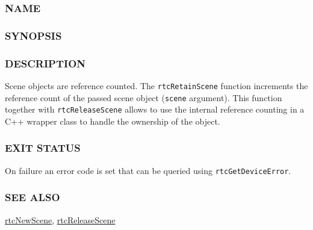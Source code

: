 \subsubsection{NAME}\label{name}

\begin{Shaded}
\begin{Highlighting}[]
\OperatorTok{{-}}
\end{Highlighting}
\end{Shaded}

\subsubsection{SYNOPSIS}\label{synopsis}

\begin{Shaded}
\begin{Highlighting}[]

\OperatorTok{(}\OperatorTok{);}
\end{Highlighting}
\end{Shaded}

\subsubsection{DESCRIPTION}\label{description}

Scene objects are reference counted. The \texttt{rtcRetainScene}
function increments the reference count of the passed scene object
(\texttt{scene} argument). This function together with
\texttt{rtcReleaseScene} allows to use the internal reference counting
in a C++ wrapper class to handle the ownership of the object.

\subsubsection{EXIT STATUS}\label{exit-status}

On failure an error code is set that can be queried using
\texttt{rtcGetDeviceError}.

\subsubsection{SEE ALSO}\label{see-also}

\hyperref[rtcnewscene]{rtcNewScene},
\hyperref[rtcreleasescene]{rtcReleaseScene}

